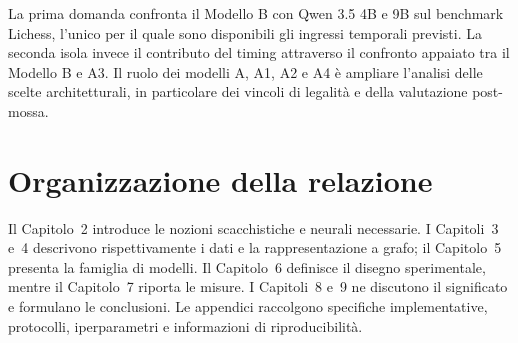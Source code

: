 La prima domanda confronta il Modello B con Qwen 3.5 4B e 9B sul benchmark Lichess,
l'unico per il quale sono disponibili gli ingressi temporali previsti. La seconda
isola invece il contributo del timing attraverso il confronto appaiato tra il
Modello B e A3. Il ruolo dei modelli A, A1, A2 e A4 è ampliare l'analisi delle scelte
architetturali, in particolare dei vincoli di legalità e della valutazione
post-mossa.

\section{Organizzazione della relazione}

Il Capitolo~2 introduce le nozioni scacchistiche e neurali necessarie. I
Capitoli~3 e~4 descrivono rispettivamente i dati e la rappresentazione a grafo; il
Capitolo~5 presenta la famiglia di modelli. Il Capitolo~6 definisce il disegno
sperimentale, mentre il Capitolo~7 riporta le misure. I Capitoli~8 e~9 ne discutono
il significato e formulano le conclusioni. Le appendici raccolgono specifiche
implementative, protocolli, iperparametri e informazioni di riproducibilità.
